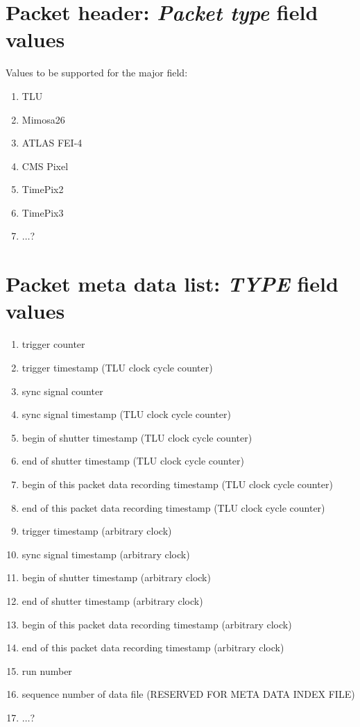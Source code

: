 \documentclass[paper=a4, fontsize=11pt]{scrartcl}	%
\numberwithin{equation}{section}		%
\numberwithin{figure}{section}			%
\numberwithin{table}{section}				%
\begin{document}
\newpage
\appendix

\section{Packet header: \emph{Packet type} field values}
\label{app:packettype}
Values to be supported for the major field:
\begin{enumerate}
\item TLU
\item Mimosa26
\item ATLAS FEI-4
\item CMS Pixel
\item TimePix2
\item TimePix3
\item $\ldots$?
\end{enumerate}

\section{Packet meta data list: \emph{TYPE} field values}
\label{app:typeid}
\begin{enumerate}
\item trigger counter
\item trigger timestamp (TLU clock cycle counter)
\item sync signal counter
\item sync signal timestamp (TLU clock cycle counter)
\item begin of shutter timestamp (TLU clock cycle counter)
\item end of shutter timestamp (TLU clock cycle counter)
\item begin of this packet data recording timestamp (TLU clock cycle counter)
\item end of this packet data recording timestamp (TLU clock cycle counter)
\item trigger timestamp (arbitrary clock)
\item sync signal timestamp (arbitrary clock)
\item begin of shutter timestamp (arbitrary clock)
\item end of shutter timestamp (arbitrary clock)
\item begin of this packet data recording timestamp (arbitrary clock)
\item end of this packet data recording timestamp (arbitrary clock)
\item run number
\item sequence number of data file (RESERVED FOR META DATA INDEX FILE)
\item $\ldots$?
\end{enumerate}
\end{document}
